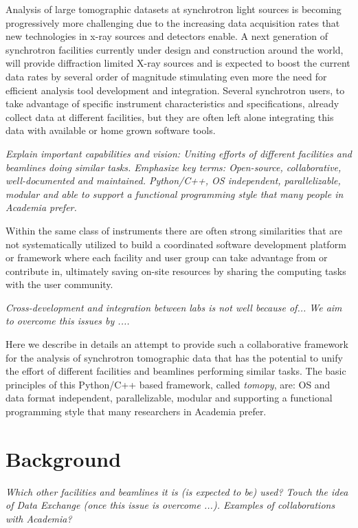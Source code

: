 \documentclass[pdf]{iucr}              %
\begin{document}
Analysis of large tomographic datasets at synchrotron light sources is becoming progressively more challenging  due to the increasing data acquisition rates that new technologies in x-ray sources and detectors enable. A next generation of synchrotron facilities currently under design and construction around the world, will provide diffraction limited X-ray sources and is expected to boost the current data rates by several order of magnitude stimulating even more the need for efficient analysis tool development and integration. Several synchrotron users, to take advantage of specific instrument characteristics and specifications,  already collect data at different facilities, but they are often left alone integrating this data with available or home grown software tools.

{\it Explain important capabilities and vision: Uniting efforts of different facilities and beamlines doing similar tasks. Emphasize key terms: Open-source, collaborative, well-documented and maintained. Python/C++, OS independent, parallelizable, modular and able to support a functional programming style that many people in Academia prefer. }

Within the same class of instruments there are often strong similarities that are not systematically utilized to build a coordinated software development platform or framework where each facility and user group can take advantage from or contribute in, ultimately saving on-site resources by sharing the computing tasks with the user community. 

{\it Cross-development and integration between labs is not well  because of... We aim to overcome this issues by ....}

Here we describe in details an attempt to provide such a collaborative framework for the analysis of synchrotron tomographic data that has the potential to unify the effort of different facilities and beamlines performing similar tasks. The basic principles of this  Python/C++ based framework, called {\it tomopy}, are: OS and data format independent, parallelizable, modular and supporting a functional programming style that many researchers in Academia prefer. 


\section{Background}

{\it Which other facilities and beamlines it is (is expected to be) used? Touch the idea of Data Exchange (once this issue is overcome ...). Examples of collaborations with Academia?}
\end{document}

